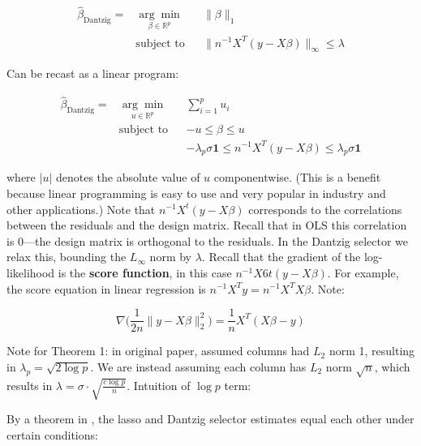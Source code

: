 \[
\begin{aligned}
\hat{\beta}_{\text{Dantzig}}  =  & {\underset {\beta \in \mathbb{R}^p}{\arg \min}}
& &  \lVert \beta \rVert_1 \\
& \text{subject to}
& &  \lVert n^{-1} X^T(y - X \beta) \rVert_\infty \leq \lambda
\end{aligned}
\]

Can be recast as a linear program:

\begin{equation}\label{linreg.dantzig.lp}
\begin{aligned}
\hat{\beta}_{\text{Dantzig}} =  & {\underset {u \in \mathbb{R}^p}{\arg \min}}
& & \sum_{i=1}^p u_i  \\
& \text{subject to}
& & -u \leq \beta \leq u \\
& & & -\lambda_p \sigma \boldsymbol{1} \leq n^{-1} X^T(y - X \beta) \leq \lambda_p \sigma \boldsymbol{1}
\end{aligned}
\end{equation}

where \(|u|\) denotes the absolute value of \(u\) componentwise. (This is a benefit because linear programming is easy to use and very popular in industry and other applications.) Note that \( n^{-1} X^t(y - X \beta) \) corresponds to the correlations between the residuals and the design matrix. Recall that in OLS this correlation is 0---the design matrix is orthogonal to the residuals. In the Dantzig selector we relax this, bounding the \(L_\infty\) norm by \(\lambda\). Recall that the gradient of the log-likelihood is the \textbf{score function}, in this case \(n^{-1} X6t(y - X \beta)\). For example, the score equation in linear regression is \(n^{-1} X^Ty = n^{-1} X^T X \beta\). Note:

\[
 \nabla \bigg( \frac{1}{2n} \lVert y - X \beta \rVert_2^2  \bigg) = \frac{1}{n} X^T (X \beta - y)
\]

Note for Theorem 1: in original paper, assumed columns had \(L_2\) norm 1, resulting in \(\lambda_p = \sqrt{2 \log p}\). We are instead assuming each column has \(L_2\) norm \(\sqrt{n}\), which results in \(\lambda = \sigma \cdot \sqrt{\frac{c \log p}{n}}\). Intuition of \(\log p\) term: 


By a theorem in \citet{James2009}, the lasso and Dantzig selector estimates equal each other under certain conditions:


